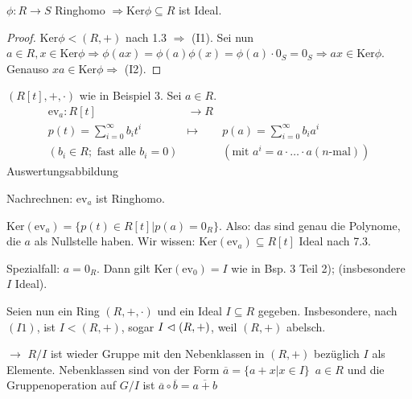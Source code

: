 \documentclass[12pt,a4paper]{scrartcl}
\begin{document}
\begin{lem} $\phi\colon R\to S$ Ringhomo $\Rightarrow \text{Ker}\phi \subseteq R$ ist Ideal.
\end{lem}

\begin{proof}
	$\text{Ker}\phi<(R,+)$ nach 1.3 $\Rightarrow$ (I1). Sei nun $a\in R, x\in\text{Ker}\phi\Rightarrow \phi(ax) = \phi(a)\phi(x) = \phi(a)\cdot 0_S = 0_S\Rightarrow ax\in \text{Ker}\phi$. Genauso $xa\in\text{Ker}\phi\Rightarrow$ (I2).
\end{proof}

\begin{bsp}
	$(R[t],+,\cdot)$ wie in Beispiel 3. Sei $a\in R$.\begin{eqnarray*}
		\text{ev}_a\colon R[t] & \to  R\\
		p(t) = \sum_{i=0}^{\infty}b_it^i &\mapsto& p(a) = \sum_{i=0}^{\infty} b_ia^i\\
		(b_i\in R; \text{ fast alle $b_i = 0$})&&(\text{mit }a^i = a\cdot\dots\cdot a (\text{$n$-mal}))
	\end{eqnarray*}
	Auswertungsabbildung
	
	Nachrechnen: $\text{ev}_a$ ist Ringhomo.
	
	$\text{Ker}(\text{ev}_a) = \{p(t)\in R[t]|p(a) = 0_R\}$. Also: das sind genau die Polynome, die $a$ als Nullstelle haben. Wir wissen: $\text{Ker}(\text{ev}_a) \subseteq R[t]$ Ideal nach 7.3.
	
	Spezialfall: $a = 0_R$. Dann gilt $\text{Ker}(\text{ev}_0)  = I$ wie in Bsp. 3 Teil 2); (insbesondere $I$ Ideal). 
\end{bsp}

Seien nun ein Ring $(R,+,\cdot)$ und ein Ideal $I\subseteq R$ gegeben. Insbesondere, nach $(I1)$, ist $I<(R,+)$, sogar $I\vartriangleleft (R,+)$, weil $(R,+)$ abelsch.

$\rightarrow$ $R/I$ ist wieder Gruppe mit den Nebenklassen in $(R,+)$ bezüglich $I$ als Elemente. Nebenklassen sind von der Form $\overline{a} = \{a+x|x\in I\}\enspace a\in R$ und die Gruppenoperation auf $G/I$ ist $\overline{a}\circ\overline{b} = \overline{a+b}$
\end{document}
